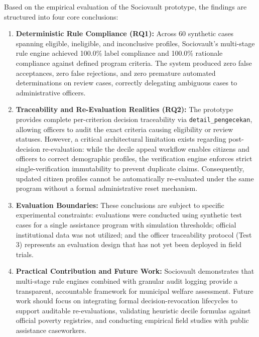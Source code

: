 \documentclass[runningheads]{llncs}
\begin{document}
Based on the empirical evaluation of the Sociovault prototype, the findings are structured into four core conclusions:
\begin{enumerate}
    \item \textbf{Deterministic Rule Compliance (RQ1):} Across 60 synthetic cases spanning eligible, ineligible, and inconclusive profiles, Sociovault's multi-stage rule engine achieved 100.0\% label compliance and 100.0\% rationale compliance against defined program criteria. The system produced zero false acceptances, zero false rejections, and zero premature automated determinations on review cases, correctly delegating ambiguous cases to administrative officers.
    \item \textbf{Traceability and Re-Evaluation Realities (RQ2):} The prototype provides complete per-criterion decision traceability via \texttt{detail\_pengecekan}, allowing officers to audit the exact criteria causing eligibility or review statuses. However, a critical architectural limitation exists regarding post-decision re-evaluation: while the decile appeal workflow enables citizens and officers to correct demographic profiles, the verification engine enforces strict single-verification immutability to prevent duplicate claims. Consequently, updated citizen profiles cannot be automatically re-evaluated under the same program without a formal administrative reset mechanism.
    \item \textbf{Evaluation Boundaries:} These conclusions are subject to specific experimental constraints: evaluations were conducted using synthetic test cases for a single assistance program with simulation thresholds; official institutional data was not utilized; and the officer traceability protocol (Test 3) represents an evaluation design that has not yet been deployed in field trials.
    \item \textbf{Practical Contribution and Future Work:} Sociovault demonstrates that multi-stage rule engines combined with granular audit logging provide a transparent, accountable framework for municipal welfare assessment. Future work should focus on integrating formal decision-revocation lifecycles to support auditable re-evaluations, validating heuristic decile formulas against official poverty registries, and conducting empirical field studies with public assistance caseworkers.
\end{enumerate}



\end{document}
